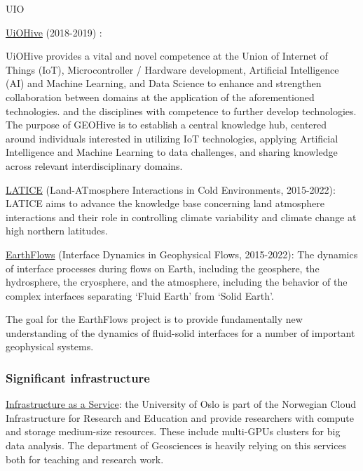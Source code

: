 \begin{sitedescription}{UIO}
\begin{compactenum}
\item \href{https://uiohive.github.io/Hive/}{UiOHive} (2018-2019) \label{desc:uiohive}: 

UiOHive provides a vital and novel competence at the Union of Internet of Things (IoT), Microcontroller / Hardware development, Artificial Intelligence (AI) and Machine Learning, and Data Science to enhance and strengthen collaboration between domains at the application of the aforementioned technologies. and the disciplines with competence to further develop technologies.
The purpose of GEOHive is to establish a central knowledge hub, centered around individuals interested in utilizing IoT technologies, applying Artificial Intelligence and Machine Learning to data challenges, and sharing knowledge across relevant interdisciplinary domains.

\item \href{https://www.mn.uio.no/geo/english/research/groups/latice/}{LATICE} (Land-ATmosphere Interactions in Cold Environments, 2015-2022): 
LATICE aims to advance the knowledge base concerning land atmosphere interactions and their role in controlling climate variability and climate change at high northern latitudes.

\item \href{https://www.mn.uio.no/geo/english/research/groups/earthflows/}{EarthFlows} (Interface Dynamics in Geophysical Flows, 2015-2022): 
The dynamics of interface processes during flows on Earth, including the geosphere, the hydrosphere, the cryosphere, and the atmosphere, including the behavior of the complex interfaces separating ‘Fluid Earth’ from ‘Solid Earth’.

The goal for the EarthFlows project is to provide fundamentally new understanding of the dynamics of fluid-solid interfaces for a number of important geophysical systems.

\end{compactenum}

\subsubsection*{Significant infrastructure}

\begin{compactenum}

\item \href{http://www.uh-iaas.no/}{Infrastructure as a Service}: the University of Oslo is part of the Norwegian Cloud Infrastructure for Research and Education and provide researchers with compute and storage medium-size resources. These include multi-GPUs clusters for big data analysis. The department of Geosciences is heavily relying on this services both for teaching and research work.


\end{compactenum}
\end{sitedescription}
